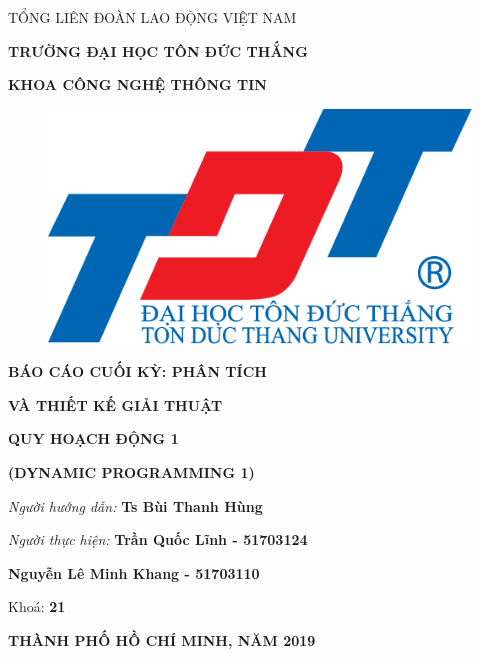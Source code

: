 
\changefontsizes[14pt]{12pt}
\centerline{TỔNG LIÊN ĐOÀN LAO ĐỘNG VIỆT NAM}

\changefontsizes[14pt]{11pt}
\centerline{\textbf{TRƯỜNG ĐẠI HỌC TÔN ĐỨC THẮNG}}
\centerline{\textbf{KHOA CÔNG NGHỆ THÔNG TIN}}

\begin{center}
	\begin{figure}[htp]
		\begin{center}
			\includegraphics[scale=.2]{./image/logo.png}
		\end{center}
	\end{figure}
\end{center}

\changefontsizes{16pt}
\centerline{\textbf{BÁO CÁO CUỐI KỲ: PHÂN TÍCH}}

\centerline{\textbf{ VÀ THIẾT KẾ GIẢI THUẬT}}
\vspace{1.5cm}
\changefontsizes{24pt}
\centerline{\textbf{QUY HOẠCH ĐỘNG 1}}


\centerline{\textbf{(DYNAMIC PROGRAMMING 1)}}

\vspace{3cm}
\begin{flushright}
	\renewcommand{\baselinestretch}{0.05}
	\changefontsizes{14pt}
	\textit{Người hướng dẫn: }\textbf{Ts Bùi Thanh Hùng}
	\setlength{\parskip}{0.5em}
	
	\textit{Người thực hiện: }\textbf{Trần Quốc Lĩnh - 51703124 }
	
	\textbf{Nguyễn Lê Minh Khang - 51703110}
	\setlength{\parskip}{0.5em}
	
	Khoá: \textbf{21}
	\setlength{\parskip}{0.5em}
	
\end{flushright}

\vspace{1.7cm}
\changefontsizes{14pt}
\centerline{\textbf{THÀNH PHỐ HỒ CHÍ MINH, NĂM 2019}}

